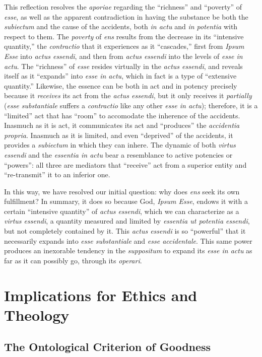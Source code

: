 This reflection resolves the \emph{aporiae} regarding the “richness” and “poverty” of \emph{esse}, as well as the apparent contradiction in having the substance be both the \emph{subiectum} and the cause of the accidents, both \emph{in actu} and \emph{in potentia} with respect to them. The \emph{poverty} of \emph{ens} results from the decrease in its “intensive quantity,” the \emph{contractio} that it experiences as it “cascades,” first from \emph{Ipsum Esse} into \emph{actus essendi}, and then from \emph{actus essendi} into the levels of \emph{esse in actu}. The “richness” of \emph{esse} resides virtually in the \emph{actus essendi}, and reveals itself as it “expands” into \emph{esse in actu}, which in fact is a type of “extensive quantity.” Likewise, the essence can be both in act and in potency precisely because it \emph{receives} its act from the \emph{actus essendi}, but it only receives it \emph{partially} (\emph{esse substantiale} suffers a \emph{contractio} like any other \emph{esse in actu}); therefore, it is a “limited” act that has “room” to accomodate the inherence of the accidents. Inasmuch as it is act, it communicates its act and “produces” the \emph{accidentia propria}. Inasmuch as it is limited, and even “deprived” of the accidents, it provides a \emph{subiectum} in which they can inhere. The dynamic of both \emph{virtus essendi} and the \emph{essentia in actu} bear a resemblance to active potencies or “powers”: all three are mediators that “receive” act from a superior entity and “re-transmit” it to an inferior one.

In this way, we have resolved our initial question: why does \emph{ens} seek its own fulfillment? In summary, it does so because God, \emph{Ipsum Esse}, endows it with a certain “intensive quantity” of \emph{actus essendi}, which we can characterize as a \emph{virtus essendi}, a quantity measured and limited by \emph{essentia ut potentia essendi}, but not completely contained by it. This \emph{actus essendi} is so “powerful” that it necessarily expands into \emph{esse substantiale} and \emph{esse accidentale}. This same power produces an inexorable tendency in the \emph{suppositum} to expand its \emph{esse in actu} as far as it can possibly go, through its \emph{operari}. 


\section{Implications for Ethics and Theology}

\subsection{The Ontological Criterion of Goodness}

